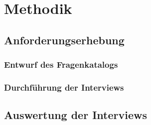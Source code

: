 \section{Methodik}\label{sec:methodik}
    \subsection{Anforderungserhebung}\label{subsec:anforderungserhebung}
        \subsubsection{Entwurf des Fragenkatalogs}\label{subsubsec:entwurf-fragenkatalog}
        \subsubsection{Durchführung der Interviews}\label{subsec:durchfuehrung-interviews}
    \subsection{Auswertung der Interviews}\label{subsec:auswertung-interviews}

